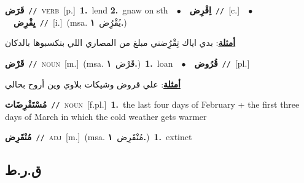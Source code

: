 \documentclass[10pt,a4paper,twoside]{article} %
\begin{document}
\begin{multicols}{2}
{\setlength\topsep{0pt}\textbf{\foreignlanguage{arabic}{قَرَض}}\ {\color{gray}\texttt{//}\color{black}}\ \textsc{verb}\ [p.]\ \textbf{1.}~lend  \textbf{2.}~gnaw on sth\ \ $\bullet$\ \ \setlength\topsep{0pt}\textbf{\foreignlanguage{arabic}{اِقْرِض}}\ {\color{gray}\texttt{//}\color{black}}\ [c.]\ \ $\bullet$\ \ \setlength\topsep{0pt}\textbf{\foreignlanguage{arabic}{يِقْرِض}}\ {\color{gray}\texttt{//}\color{black}}\ [i.]\ \color{gray}(msa. \foreignlanguage{arabic}{يُقْرُِض}~\foreignlanguage{arabic}{\textbf{١.}})\color{black}\  \begin{flushright}\color{gray}\foreignlanguage{arabic}{\textbf{\underline{\foreignlanguage{arabic}{أمثلة}}}: بدي اياك تِقْرُِضني مبلغ من المصاري اللي بتكسبوها بالدكان}\end{flushright}\color{black}} \vspace{2mm}

{\setlength\topsep{0pt}\textbf{\foreignlanguage{arabic}{قَرْض}}\ {\color{gray}\texttt{//}\color{black}}\ \textsc{noun}\ [m.]\ \color{gray}(msa. \foreignlanguage{arabic}{قَرْض}~\foreignlanguage{arabic}{\textbf{١.}})\color{black}\ \textbf{1.}~loan\ \ $\bullet$\ \ \setlength\topsep{0pt}\textbf{\foreignlanguage{arabic}{قُرُوض}}\ {\color{gray}\texttt{//}\color{black}}\ [pl.]\  \begin{flushright}\color{gray}\foreignlanguage{arabic}{\textbf{\underline{\foreignlanguage{arabic}{أمثلة}}}: علي قروض وشيكات بلاوي وين أروح بحالي}\end{flushright}\color{black}} \vspace{2mm}

{\setlength\topsep{0pt}\textbf{\foreignlanguage{arabic}{مُسْتَقْرِضَات}}\ {\color{gray}\texttt{//}\color{black}}\ \textsc{noun}\ [f.pl.]\ \textbf{1.}~the last four days of February + the first three days of March in which the cold weather gets warmer\ } \vspace{2mm}

{\setlength\topsep{0pt}\textbf{\foreignlanguage{arabic}{مُنْقَرِض}}\ {\color{gray}\texttt{//}\color{black}}\ \textsc{adj}\ [m.]\ \color{gray}(msa. \foreignlanguage{arabic}{مُنْقَرِض}~\foreignlanguage{arabic}{\textbf{١.}})\color{black}\ \textbf{1.}~extinct\ } \vspace{2mm}

\vspace{-3mm}
\subsection*{\color{blue}\foreignlanguage{arabic}{ق.ر.ط}\color{blue}{}} 


\end{multicols}
\end{document}
